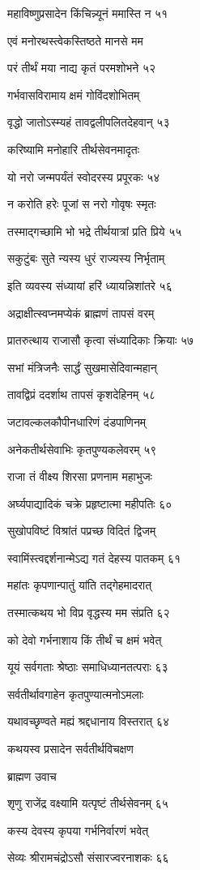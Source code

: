 महाविष्णुप्रसादेन किंचिन्न्यूनं ममास्ति न ५१

एवं मनोरथस्त्वेकस्तिष्ठते मानसे मम

परं तीर्थं मया नाद्य कृतं परमशोभने ५२

गर्भवासविरामाय क्षमं गोविंदशोभितम्

वृद्धो जातोऽस्म्यहं तावद्वलीपलितदेहवान् ५३

करिष्यामि मनोहारि तीर्थसेवनमादृतः

यो नरो जन्मपर्यंतं स्वोदरस्य प्रपूरकः ५४

न करोति हरेः पूजां स नरो गोवृषः स्मृतः

तस्माद्गच्छामि भो भद्रे तीर्थयात्रां प्रति प्रिये ५५

सकुटुंबः सुते न्यस्य धुरं राज्यस्य निर्भृताम्

इति व्यवस्य संध्यायां हरिं ध्यायन्निशांतरे ५६

अद्राक्षीत्स्वप्नमप्येकं ब्राह्मणं तापसं वरम्

प्रातरुत्थाय राजासौ कृत्वा संध्यादिकाः क्रियाः ५७

सभां मंत्रिजनैः सार्द्धं सुखमासेदिवान्महान्

तावद्विप्रं ददर्शाथ तापसं कृशदेहिनम् ५८

जटावल्कलकौपीनधारिणं दंडपाणिनम्

अनेकतीर्थसेवाभिः कृतपुण्यकलेवरम् ५९

राजा तं वीक्ष्य शिरसा प्रणनाम महाभुजः

अर्घ्यपाद्यादिकं चक्रे प्रहृष्टात्मा महीपतिः ६०

सुखोपविष्टं विश्रांतं पप्रच्छ विदितं द्विजम्

स्वामिंस्त्वद्दर्शनान्मेऽद्य गतं देहस्य पातकम् ६१

महांतः कृपणान्पातुं यांति तद्गेहमादरात्

तस्मात्कथय भो विप्र वृद्धस्य मम संप्रति ६२

को देवो गर्भनाशाय किं तीर्थं च क्षमं भवेत्

यूयं सर्वगताः श्रेष्ठाः समाधिध्यानतत्पराः ६३

सर्वतीर्थावगाहेन कृतपुण्यात्मनोऽमलाः

यथावच्छृण्वते मह्यं श्रद्दधानाय विस्तरात् ६४

कथयस्व प्रसादेन सर्वतीर्थविचक्षण

ब्राह्मण उवाच

शृणु राजेंद्र वक्ष्यामि यत्पृष्टं तीर्थसेवनम् ६५

कस्य देवस्य कृपया गर्भनिर्वारणं भवेत्

सेव्यः श्रीरामचंद्रोऽसौ संसारज्वरनाशकः ६६

